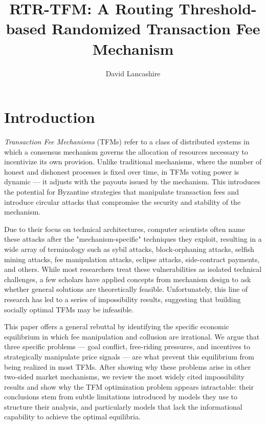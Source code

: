 \documentclass[sigconf,anonymous]{aamas}
\title[Routing Threshold-based Randomized Transaction Fee Mechanism]{RTR-TFM: A Routing Threshold-based Randomized Transaction Fee Mechanism}
\author{David Lancashire}
\affiliation{
  \institution{Proclus Technologies}
  \city{Bangkok}
  \country{Thailand}}
\begin{document}
\pagestyle{fancy}
\fancyhead{}

\maketitle 

\section{Introduction \label{sec::introduction}}

\emph{Transaction Fee Mechanisms} (TFMs) refer to a class of distributed systems in which a consensus mechanism governs the allocation of resources necessary to incentivize its own provision. Unlike traditional mechanisms, where the number of honest and dishonest processes is fixed over time, in TFMs voting power is dynamic — it adjusts with the payouts issued by the mechanism. This introduces the potential for Byzantine strategies that manipulate transaction fees and introduce circular attacks that compromise the security and stability of the mechanism.

Due to their focus on technical architectures, computer scientists often name these attacks after the "mechanism-specific" techniques they exploit, resulting in a wide array of terminology such as sybil attacks, block-orphaning attacks, selfish mining attacks, fee manipulation attacks, eclipse attacks, side-contract payments, and others. While most researchers treat these vulnerabilities as isolated technical challenges, a few scholars have applied concepts from mechanism design to ask whether general solutions are theoretically feasible. Unfortunately, this line of research has led to a series of impossibility results, suggesting that building socially optimal TFMs may be infeasible.

This paper offers a general rebuttal by identifying the specific economic equilibrium in which fee manipulation and collusion are irrational. We argue that three specific problems — goal conflict, free-riding pressures, and incentives to strategically manipulate price signals — are what prevent this equilibrium from being realized in most TFMs. After showing why these problems arise in other two-sided market mechanisms, we review the most widely cited impossibility results and show why the TFM optimization problem appears intractable: their conclusions stem from subtle limitations introduced by models they use to structure their analysis, and particularly models that lack the informational capability to achieve the optimal equilibria.
\end{document}
